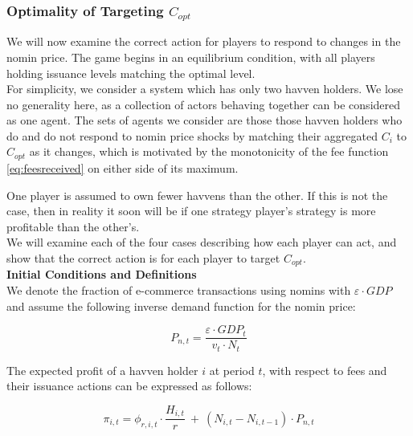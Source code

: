 \newpage
\subsubsection{Optimality of Targeting \(C_{opt}\)}
\label{subsubsec:coptimality}

\noindent We will now examine the correct action for players to respond to changes in the
nomin price. The game begins in an equilibrium condition, with all players holding issuance
levels matching the optimal level. \\

\noindent For simplicity, we consider a system which has only two havven holders. We lose no generality
here, as a collection of actors behaving together can be considered as one agent. The sets of agents 
we consider are those those havven holders who do and do not respond to nomin price shocks by
matching their aggregated \(C_i\) to  \(C_{opt}\) as it changes, which is motivated by the
monotonicity of the fee function \eqref{eq:feesreceived} on either side of its maximum.

\noindent One player is assumed to own fewer havvens than the other. If this is not the case,
then in reality it soon will be if one strategy player's strategy is more profitable
than the other's. \\

\noindent We will examine each of the four cases describing how each player can act, and 
show that the correct action is for each player to target \(C_{opt}\). \\

\noindent \textbf{Initial Conditions and Definitions} \\

\noindent We denote the fraction of e-commerce transactions using nomins with \(\varepsilon \cdot GDP\) and
assume the following inverse demand function for the nomin price:

\begin{equation*}
    \label{eq:nominprice} P_{n,t} = \frac{\varepsilon \cdot GDP_t}{v_t \cdot N_t}
\end{equation*}

\vspace{2mm}

\noindent The expected profit of a havven holder \(i\) at period \(t\), with
respect to fees and their issuance actions can be expressed as follows:

\begin{equation*} 
    \pi_{i,t} = \phi_{r,i,t} \cdot \frac{H_{i,t}}{r} \ + \ (N_{i,t} - N_{i,t-1}) \cdot P_{n,t} \label{eq:profit}
\end{equation*}

